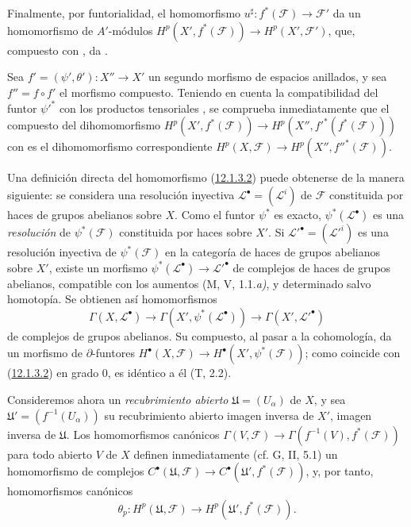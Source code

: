\begin{env}[12.1.3]
Finalmente, por funtorialidad, el homomorfismo
$u^\sharp:f^*(\mathcal F)\to\mathcal F'$ da un homomorfismo de
$A'$-módulos
$H^p(X',f^*(\mathcal F))\to H^p(X',\mathcal F')$,
que, compuesto con , da
.

Sea $f'=(\psi',\theta'):X''\to X'$ un segundo morfismo de espacios
anillados, y sea $f''=f\circ f'$ el morfismo compuesto.
Teniendo en cuenta la compatibilidad del funtor $\psi'^*$ con los
productos tensoriales , se comprueba
inmediatamente que el compuesto del dihomomorfismo
$H^p(X',f^*(\mathcal F))\to H^p(X'',f'^*(f^*(\mathcal F)))$
con  es el dihomomorfismo correspondiente
$H^p(X,\mathcal F)\to H^p(X'',f''^*(\mathcal F))$.
\end{env}

\begin{env}[12.1.4]
\label{0.12.1.4-fr}
Una definición directa del homomorfismo (\hyperref[0.12.1.3.2-fr]{12.1.3.2}) puede obtenerse de la manera siguiente: se considera una resolución inyectiva $\mathcal L^\bullet=(\mathcal L^i)$ de $\mathcal F$ constituida por haces de
grupos abelianos sobre $X$.
Como el funtor $\psi^*$ es exacto,
$\psi^*(\mathcal L^\bullet)$ es una \emph{resolución} de $\psi^*(\mathcal F)$
constituida por haces sobre $X'$.
Si $\mathcal L'^\bullet=(\mathcal L'^i)$ es una resolución inyectiva de
$\psi^*(\mathcal F)$ en la categoría de haces de grupos abelianos sobre
$X'$, existe un morfismo
$\psi^*(\mathcal L^\bullet)\to\mathcal L'^\bullet$
de complejos de haces de grupos abelianos, compatible con los
aumentos (M, V, 1.1.\emph{a)}, y determinado salvo homotopía.
Se obtienen así homomorfismos
\[
\Gamma(X,\mathcal L^\bullet)\longrightarrow
\Gamma(X',\psi^*(\mathcal L^\bullet))\longrightarrow
\Gamma(X',\mathcal L'^\bullet)
\]
de complejos de grupos abelianos.
Su compuesto, al pasar a la cohomología, da un morfismo de
$\partial$-funtores
$H^\bullet(X,\mathcal F)\to H^\bullet(X',\psi^*(\mathcal F))$; como coincide con (\hyperref[0.12.1.3.2-fr]{12.1.3.2}) en grado 0, es idéntico a él (T, 2.2).

Consideremos ahora un \emph{recubrimiento abierto}
$\mathfrak U=(U_\alpha)$ de $X$, y sea
$\mathfrak U'=(f^{-1}(U_\alpha))$ su recubrimiento abierto imagen inversa
de $X'$, imagen inversa de $\mathfrak U$. Los homomorfismos canónicos $\Gamma(V,\mathcal F)\to\Gamma(f^{-1}(V),f^*(\mathcal F))$ para todo abierto $V$ de $X$ definen inmediatamente (cf. G, II, 5.1) un homomorfismo de complejos
$C^\bullet(\mathfrak U,\mathcal F)\to
C^\bullet(\mathfrak U',f^*(\mathcal F))$,
y, por tanto, homomorfismos canónicos
\[
\label{0.12.1.4.1-fr}
\tag{12.1.4.1}
\theta_p:H^p(\mathfrak U,\mathcal F)
\longrightarrow H^p(\mathfrak U',f^*(\mathcal F)).
\]


\end{env}
